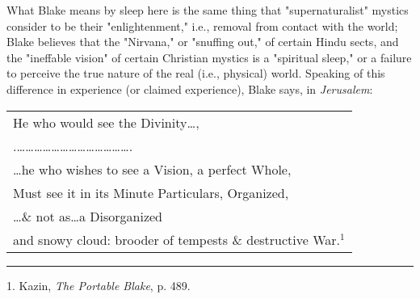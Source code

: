 \hspace*{5mm}What Blake means by sleep here is the same thing that "supernaturalist" mystics consider to be their
"enlightenment," i.e., removal from contact with the world; Blake believes that the "Nirvana," or
"snuffing out," of certain Hindu sects, and the "ineffable vision" of certain Christian
mystics is a "spiritual sleep," or a failure to perceive the true nature of the real (i.e., physical) world.
Speaking of this difference in experience (or claimed experience), Blake says, in \textit{Jerusalem}:\par
\begin{center}
	\parbox{0.8\textwidth}{
		\centering
		\begin{tabular}{l}
			He who would see the Divinity\dots,                                 \\
			.\dots\dots\dots\dots\dots\dots\dots\dots\dots\dots\dots\dots\dots. \\
			\dots he who wishes to see a Vision, a perfect Whole,               \\
			Must see it in its Minute Particulars, Organized,                   \\
			\dots \& not as\dots a Disorganized                                 \\
			and snowy cloud: brooder of tempests \& destructive War.$^{1}$
		\end{tabular}
	}%
\end{center}
\vspace*{\fill}
\noindent\rule{0.25\textwidth}{0.4pt}\par
1. Kazin, \textit{The Portable Blake}, p. 489.\par

\newpage


